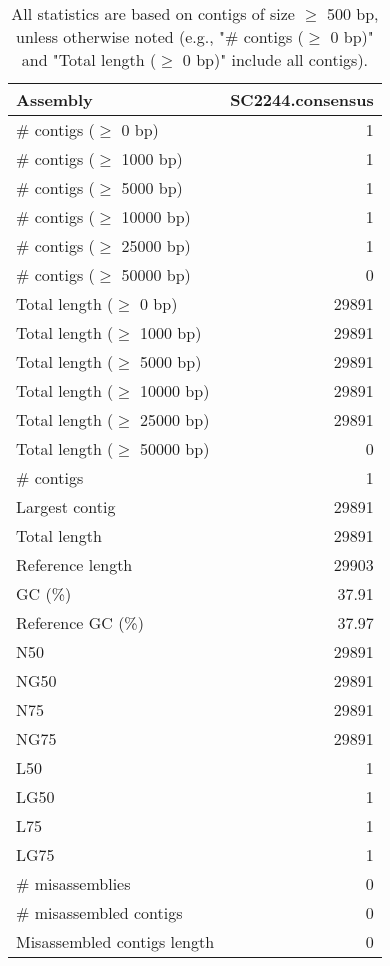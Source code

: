 \documentclass[12pt,a4paper]{article}
\begin{document}
\begin{table}[ht]
\begin{center}
\caption{All statistics are based on contigs of size $\geq$ 500 bp, unless otherwise noted (e.g., "\# contigs ($\geq$ 0 bp)" and "Total length ($\geq$ 0 bp)" include all contigs).}
\begin{tabular}{|l*{1}{|r}|}
\hline
Assembly & SC2244.consensus \\ \hline
\# contigs ($\geq$ 0 bp) & 1 \\ \hline
\# contigs ($\geq$ 1000 bp) & 1 \\ \hline
\# contigs ($\geq$ 5000 bp) & 1 \\ \hline
\# contigs ($\geq$ 10000 bp) & 1 \\ \hline
\# contigs ($\geq$ 25000 bp) & 1 \\ \hline
\# contigs ($\geq$ 50000 bp) & 0 \\ \hline
Total length ($\geq$ 0 bp) & 29891 \\ \hline
Total length ($\geq$ 1000 bp) & 29891 \\ \hline
Total length ($\geq$ 5000 bp) & 29891 \\ \hline
Total length ($\geq$ 10000 bp) & 29891 \\ \hline
Total length ($\geq$ 25000 bp) & 29891 \\ \hline
Total length ($\geq$ 50000 bp) & 0 \\ \hline
\# contigs & 1 \\ \hline
Largest contig & 29891 \\ \hline
Total length & 29891 \\ \hline
Reference length & 29903 \\ \hline
GC (\%) & 37.91 \\ \hline
Reference GC (\%) & 37.97 \\ \hline
N50 & 29891 \\ \hline
NG50 & 29891 \\ \hline
N75 & 29891 \\ \hline
NG75 & 29891 \\ \hline
L50 & 1 \\ \hline
LG50 & 1 \\ \hline
L75 & 1 \\ \hline
LG75 & 1 \\ \hline
\# misassemblies & 0 \\ \hline
\# misassembled contigs & 0 \\ \hline
Misassembled contigs length & 0 \\ \hline

\end{tabular}
\end{center}
\end{table}
\end{document}
